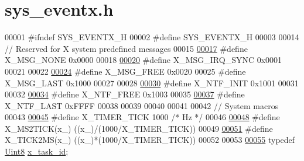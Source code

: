 \hypertarget{a00036_source}{\section{sys\+\_\+eventx.\+h}
\label{a00036_source}
}

\begin{DoxyCode}
00001 \textcolor{preprocessor}{#ifndef SYS\_EVENTX\_H}
00002 \textcolor{preprocessor}{#define SYS\_EVENTX\_H}
00003 
00014 \textcolor{comment}{// Reserved for X system predefined messages}
00015 
\hypertarget{a00036_source_l00017}{}\hyperlink{a00036_a4431051080c1f46fda1a2ce7d4931aa8}{00017} \textcolor{preprocessor}{#define X\_MSG\_NONE            0x0000}
00018 
\hypertarget{a00036_source_l00020}{}\hyperlink{a00036_a104f1137aafb33160da80932fe63c40d}{00020} \textcolor{preprocessor}{#define X\_MSG\_IRQ\_SYNC        0x0001}
00021 
00022 
\hypertarget{a00036_source_l00024}{}\hyperlink{a00036_a082eb6e82ded25b00f04da4f611c961e}{00024} \textcolor{preprocessor}{#define X\_MSG\_FREE            0x0020}
00025 \textcolor{preprocessor}{#define X\_MSG\_LAST            0x1000}
00027 
00028 
\hypertarget{a00036_source_l00030}{}\hyperlink{a00036_a620b808f2d7b8d2a03c4d026a4c5423c}{00030} \textcolor{preprocessor}{#define X\_NTF\_INIT            0x1001}
00031 
00032 
\hypertarget{a00036_source_l00034}{}\hyperlink{a00036_ab2eeea4643823a0c7c7731ddb83e3edc}{00034} \textcolor{preprocessor}{#define X\_NTF\_FREE            0x1003}
00035 
\hypertarget{a00036_source_l00037}{}\hyperlink{a00036_a63072b0b734748ae21fd9e7435467683}{00037} \textcolor{preprocessor}{#define X\_NTF\_LAST            0xFFFF}
00038 
00039 
00040 
00041 
00042 \textcolor{comment}{// System macros}
00043 
\hypertarget{a00036_source_l00045}{}\hyperlink{a00036_ac606e478c91dc9a2ddc0816152b18979}{00045} \textcolor{preprocessor}{#define X\_TIMER\_TICK        1000 }\textcolor{comment}{/* Hz */}\textcolor{preprocessor}{}
00046 
\hypertarget{a00036_source_l00048}{}\hyperlink{a00036_a1732cd929c486b3a225824bb2b3dba36}{00048} \textcolor{preprocessor}{#define X\_MS2TICK(x\_)       ((x\_)/(1000/X\_TIMER\_TICK))}
00049 
\hypertarget{a00036_source_l00051}{}\hyperlink{a00036_a8c687347943f251bc052fa9a43a2b69b}{00051} \textcolor{preprocessor}{#define X\_TICK2MS(x\_)       ((x\_)*(1000/X\_TIMER\_TICK))}
00052 
00053 
\hypertarget{a00036_source_l00055}{}\hyperlink{a00036_ad5c3c5fbfd3e4aadf22830395484a71d}{00055} \textcolor{keyword}{typedef} \hyperlink{a00072_af84840501dec18061d18a68c162a8fa2}{Uint8} \hyperlink{a00036_ad5c3c5fbfd3e4aadf22830395484a71d}{x\_task\_id};

\end{DoxyCode}
